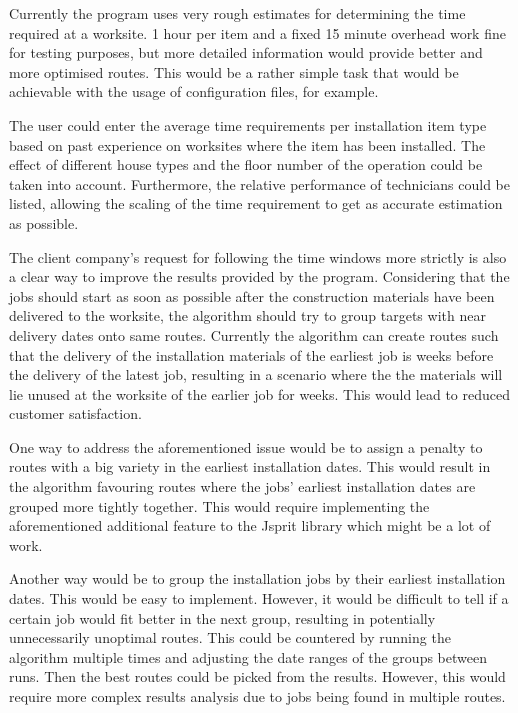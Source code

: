 Currently the program uses very rough estimates for determining the time required at a worksite. 1 hour per item and a fixed 15 minute overhead work fine for testing purposes, but more detailed information would provide better and more optimised routes. This would be a rather simple task that would be achievable with the usage of configuration files, for example. 

The user could enter the average time requirements per installation item type based on past experience on worksites where the item has been installed. The effect of different house types and the floor number of the operation could be taken into account. Furthermore, the relative performance of technicians could be listed, allowing the scaling of the time requirement to get as accurate estimation as possible.

The client company's request for following the time windows more strictly is also a clear way to improve the results provided by the program. Considering that the jobs should start as soon as possible after the construction materials have been delivered to the worksite, the algorithm should try to group targets with near delivery dates onto same routes. Currently the algorithm can create routes such that the delivery of the installation materials of the earliest job is weeks before the delivery of the latest job, resulting in a scenario where the the materials will lie  unused at the worksite of the earlier job for weeks. This would lead to reduced customer satisfaction.

One way to address the aforementioned issue would be to assign a penalty to routes with a big variety in the earliest installation dates. This would result in the algorithm favouring routes where the jobs' earliest installation dates are grouped more tightly together. This would require implementing the aforementioned additional feature to the Jsprit library which might be a lot of work. 

Another way would be to group the installation jobs by their earliest installation dates. This would be easy to implement. However, it would be difficult to tell if a certain job would fit better in the next group, resulting in potentially unnecessarily unoptimal routes. This could be countered by running the algorithm multiple times and adjusting the date ranges of the groups between runs. Then the best routes could be picked from the results. However, this would require more complex results analysis due to jobs being found in multiple routes. 

